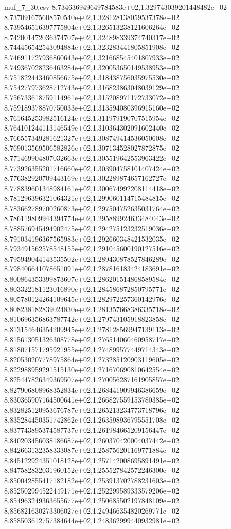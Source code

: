 \begin{filecontents*}{muf_7_30.csv}
8.734636949649784583e+02,1.329743039201448482e+02
8.737091675608570540e+02,1.328128138059537378e+02
8.739546516397775804e+02,1.326513238121606264e+02
8.742001472036374707e+02,1.324898339374740317e+02
8.744456542543094884e+02,1.323283441805851908e+02
8.746911727936860643e+02,1.321668545401807933e+02
8.749367028236463284e+02,1.320053650149538953e+02
8.751822443460856675e+02,1.318438756035975530e+02
8.754277973628712743e+02,1.316823863048039129e+02
8.756733618759114961e+02,1.315208971172733072e+02
8.759189378870750033e+02,1.313594080396915160e+02
8.761645253982516124e+02,1.311979190707515954e+02
8.764101244113146549e+02,1.310364302091602440e+02
8.766557349281621327e+02,1.308749414536050608e+02
8.769013569506582826e+02,1.307134528027872875e+02
8.771469904807032663e+02,1.305519642553963422e+02
8.773926355201716660e+02,1.303904758101407424e+02
8.776382920709443169e+02,1.302289874657162727e+02
8.778839601348984161e+02,1.300674992208114418e+02
8.781296396321064321e+02,1.299060114715484815e+02
8.783662789700260873e+02,1.297504752635031764e+02
8.786119809944394774e+02,1.295889924633484043e+02
8.788576945494902475e+02,1.294275123232519036e+02
8.791034196367565983e+02,1.292660348421532035e+02
8.793491562578548155e+02,1.291045600190127516e+02
8.795949044143535502e+02,1.289430878527846289e+02
8.798406641078651091e+02,1.287816183424183691e+02
8.800864353399873607e+02,1.286201514868589584e+02
8.803322181123016890e+02,1.284586872850795771e+02
8.805780124264109645e+02,1.282972257360142976e+02
8.808238182839024830e+02,1.281357668386335718e+02
8.810696356863787742e+02,1.279743105918823858e+02
8.813154646354209945e+02,1.278128569947139113e+02
8.815613051326308778e+02,1.276514060460958717e+02
8.818071571795921955e+02,1.274899577449714343e+02
8.820530207778975864e+02,1.273285120903119605e+02
8.822988959291515130e+02,1.271670690810642554e+02
8.825447826349369507e+02,1.270056287161905857e+02
8.827906808968352834e+02,1.268441909946386659e+02
8.830365907164500641e+02,1.266827559153780385e+02
8.832825120953676787e+02,1.265213234773718796e+02
8.835284450351742862e+02,1.263598936795551708e+02
8.837743895374587737e+02,1.261984665209156447e+02
8.840203456038186687e+02,1.260370420004037442e+02
8.842663132358333087e+02,1.258756201169771884e+02
8.845122924351018128e+02,1.257142008695891491e+02
8.847582832031960152e+02,1.255527842572246300e+02
8.850042855417182182e+02,1.253913702788231603e+02
8.852502994522449171e+02,1.252299589333579206e+02
8.854963249363655677e+02,1.250685502197848109e+02
8.856821630273306027e+02,1.249466354820269771e+02
8.858503612757384644e+02,1.248362999440932981e+02

\end{filecontents*}
